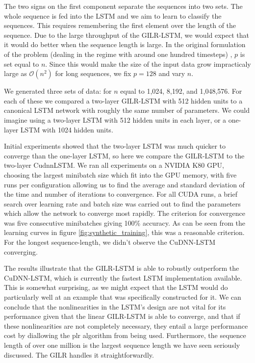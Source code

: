\documentclass{article}
\begin{document}
The two signs on the first component separate the sequences into two sets. The
whole sequence is fed into the LSTM and we aim to learn to classify the
sequences. This requires remembering the first element over the length of the
sequence. Due to the large throughput of the GILR-LSTM, we would expect that it
would do better when the sequence length is large. In the original formulation
of the problem (dealing in the regime with around one hundred timesteps)
, \(p\) is set equal to \(n\). Since this would make the size of the input data
grow impracticaly large as \(\mathcal{O}(n^2)\) for long sequences, we fix \(p =
128\) and vary \(n\).

We generated three sets of data: for \(n\) equal to 1,024, 8,192, and
1,048,576. For each of these we compared a two-layer GILR-LSTM with 512 hidden
units to a canonical LSTM network with roughly the same number of parameters. We
could imagine using a two-layer LSTM with 512 hidden units in each layer, or a
one-layer LSTM with 1024 hidden units.

Initial experiments showed that the two-layer LSTM was much quicker to converge
than the one-layer LSTM, so here we compare the GILR-LSTM to the two-layer
CudnnLSTM.  We ran all experiments on a NVIDIA K80 GPU, choosing the largest
minibatch size which fit into the GPU memory, with five runs per configuration
allowing us to find the average and standard deviation of the time and number of
iterations to convergence. For all CUDA runs, a brief search over learning rate
and batch size was carried out to find the parameters which allow the network to
converge most rapidly. The criterion for convergence was five consecutive
minibatches giving 100\% accuracy. As can be seen from the learning curves
in figure \ref{fig:synthetic_training}, this was a reasonable criterion. For the
longest sequence-length, we didn't observe the CuDNN-LSTM converging.

The results illustrate that the GILR-LSTM is able to robustly outperform the
CuDNN-LSTM, which is currently the fastest LSTM implementation available. This
is somewhat surprising, as we might expect that the LSTM would do particularly
well at an example that was specifically constructed for it. We can conclude that
the nonlinearities in the LSTM's design are not vital for its performance given
that the linear GILR-LSTM is able to converge, and that if these nonlinearities are
not completely necessary, they entail a large performance cost by diallowing the
plr algorithm from being used. Furthermore, the sequence length of over one million
is the largest sequence length we have seen seriously discussed. The GILR
handles it straightforwardly.
\end{document}
